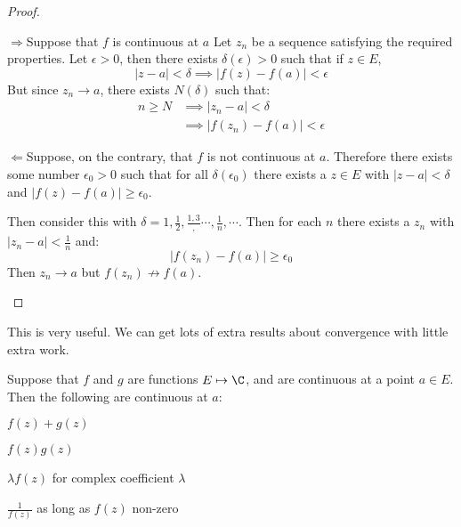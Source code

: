 \documentclass[../Main.tex]{subfiles}
\begin{document}
\begin{proof}
    \begin{proofdirection}{$\Rightarrow$}{Suppose that $f$ is continuous at $a$}
        Let $z_n$ be a sequence satisfying the required properties. Let $\epsilon > 0$, then there exists $\delta(\epsilon) > 0$ such that if $z \in E$,
        \begin{equation*}
            |z - a| < \delta \implies |f(z) - f(a)| < \epsilon
        \end{equation*}
        But since $z_n \to a$, there exists $N(\delta)$ such that:
        \begin{align*}
            n \geq N &\implies |z_n - a| < \delta \\
            &\implies |f(z_n) - f(a)| < \epsilon
        \end{align*}
    \end{proofdirection}
    \begin{proofdirection}{$\Leftarrow$}{Suppose, on the contrary, that $f$ is not continuous at $a$.}
        Therefore there exists some number $\epsilon_0 > 0$ such that for all $\delta(\epsilon_0)$ there exists a $z \in E$ with $|z - a| < \delta$ and $|f(z) - f(a)| \geq \epsilon_0$.\par
        Then consider this with $\delta = 1, \frac{1}{2}, \frac{1, 3}, \cdots, \frac{1}{n}, \cdots$. Then for each $n$ there exists a $z_n$ with $|z_n - a| < \frac{1}{n}$ and:
        \begin{equation*}
            |f(z_n) - f(a)| \geq \epsilon_0
        \end{equation*}
        Then $z_n \to a$ but $f(z_n) \not\to f(a)$.
    \end{proofdirection}
\end{proof}
This is very useful. We can get lots of extra results about convergence with little extra work.
\begin{propositions}{
        Suppose that $f$ and $g$ are functions $E \mapsto \C$, and are continuous at a point $a \in E$. Then the following are continuous at $a$:
        \label{propsContinuityProperties}
    }
    \item $f(z) + g(z)$ \label{propSumContinuity}
    \item $f(z)g(z)$ \label{propProductContinuity}
    \item $\lambda f(z)$ for complex coefficient $\lambda$ \label{propScalingContinuity}
    \item $\frac{1}{f(z)}$ as long as $f(z)$ non-zero \label{propReciprocalContinuity}
\end{propositions}
\end{document}
